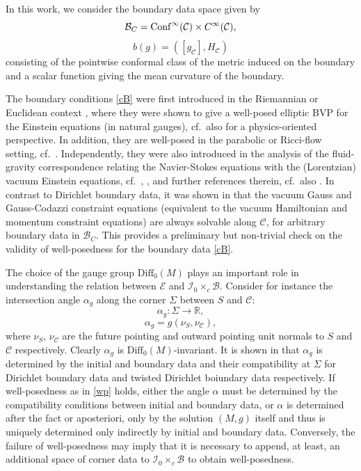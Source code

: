 \documentclass[10pt]{amsart}
\renewcommand{\a}{\alpha}
\newcommand{\Si}{\Sigma}
\newcommand{\cC}{{\mathcal C}}
\newcommand{\cB}{{\mathcal B}}
\newcommand{\cE}{{\mathcal E}}
\newcommand{\cI}{\mathcal I}
\newcommand{\bR}{\mathbb R}
\newcommand{\Diff}{\mathrm{Diff}}
\newcommand{\be}{\begin{equation}}
\newcommand{\ee}{\end{equation}}
\renewcommand{\to}{\rightarrow}
\newcommand{\<}{\langle}
\renewcommand{\>}{\rangle}
\theoremstyle{plain}
\theoremstyle{remark}
\theoremstyle{definition}
\numberwithin{equation}{section}
\begin{document}
   In this work, we consider the boundary data space given by 
\be \label{cB}
\cB_C = {\rm Conf}^{\infty}(\cC)\times C^{\infty}(\cC),
\ee
$$b(g) = ([g_{\cC}], H_{\cC})$$
consisting of the pointwise conformal class of the metric induced on the boundary and a scalar function giving the mean curvature of the boundary. 

  The boundary conditions \eqref{cB} were first introduced in the Riemannian or Euclidean context \cite{A1}, where they were shown to give a 
well-posed elliptic BVP for the Einstein equations (in natural gauges), cf.~also \cite{W} for a physics-oriented perspective. In addition, they are 
well-posed in the parabolic or Ricci-flow setting, cf.~\cite{G}. Independently, they were also introduced in the analysis of the fluid-gravity 
correspondence relating the Navier-Stokes equations with the (Lorentzian) vacuum Einstein equations, cf.~\cite{BS}, \cite{AABN}, \cite{AGAM} and 
further references therein, cf.~also \cite{BSS}. In contrast to Dirichlet boundary data, it was shown in \cite{AA2} that the vacuum Gauss and Gauss-Codazzi 
constraint equations (equivalent to the vacuum Hamiltonian and momentum constraint equations) are always solvable along $\cC$, for arbitrary boundary 
data in $\cB_C$. This provides a preliminary but non-trivial check on the validity of well-posedness for the boundary data \eqref{cB}. 

\medskip 

  The choice of the gauge group $\Diff_0(M)$ plays an important role in understanding the relation between $\cE$ and $\cI_0\times_c \cB$. Consider 
for instance the intersection angle $\a_g$ along the corner $\Si$ between $S$ and $\cC$: 
\be \label{angle}
\a_g: \Si \to \bR,
\ee 
$$\a_g = g(\nu_S, \nu_{\cC}),$$
where $\nu_S$, $\nu_{\cC}$ are the future pointing and outward pointing unit normals to $S$ and $\cC$ respectively. Clearly $\a_g$ is 
$\Diff_0(M)$-invariant. It is shown in \cite{I, II} that $\a_g $ is determined by the initial and boundary data and their compatibility at $\Si$ for Dirichlet 
boundary data and twisted Dirichlet boiundary data respectively. If well-posedness as in \eqref{wp} holds, either the angle $\a$ must be determined by the compatibility 
conditions between initial and boundary data, or $\a$ is determined after the fact or aposteriori, only by the solution $(M, g)$ itself and thus is uniquely 
determined only indirectly by initial and boundary data. Conversely, the failure of well-posedness may imply that it is necessary to append, at least, an 
additional space of corner data to $\cI_0\times_c \cB$ to obtain well-posedness. 
\end{document}
